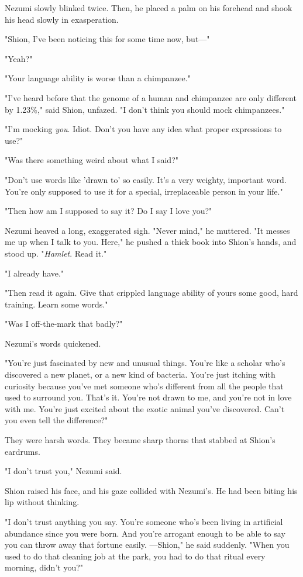 Nezumi slowly blinked twice. Then, he placed a palm on his forehead and
shook his head slowly in exasperation.

"Shion, I've been noticing this for some time now, but---"

"Yeah?"

"Your language ability is worse than a chimpanzee."

"I've heard before that the genome of a human and chimpanzee are only
different by 1.23\%," said Shion, unfazed. "I don't think you should
mock chimpanzees."

"I'm mocking \emph{you}. Idiot. Don't you have any idea what proper expressions
to use?"

"Was there something weird about what I said?"

"Don't use words like 'drawn to' so easily. It's a very weighty,
important word. You're only supposed to use it for a special,
irreplaceable person in your life."

"Then how am I supposed to say it? Do I say I love you?"

Nezumi heaved a long, exaggerated sigh. "Never mind," he muttered. "It
messes me up when I talk to you. Here," he pushed a thick book into
Shion's hands, and stood up. "\emph{Hamlet}. Read it."

"I already have."

"Then read it again. Give that crippled language ability of yours some
good, hard training. Learn some words."

"Was I off-the-mark that badly?"

Nezumi's words quickened.

"You're just fascinated by new and unusual things. You're like a scholar
who's discovered a new planet, or a new kind of bacteria. You're just
itching with curiosity because you've met someone who's different from
all the people that used to surround you. That's it. You're not drawn to
me, and you're not in love with me. You're just excited about the exotic
animal you've discovered. Can't you even tell the difference?"

They were harsh words. They became sharp thorns that stabbed at Shion's
eardrums.

"I don't trust you," Nezumi said.

Shion raised his face, and his gaze collided with Nezumi's. He had been
biting his lip without thinking.

"I don't trust anything you say. You're someone who's been living in
artificial abundance since you were born. And you're arrogant enough to
be able to say you can throw away that fortune easily. ---Shion," he said
suddenly. "When you used to do that cleaning job at the park, you had to
do that ritual every morning, didn't you?"

